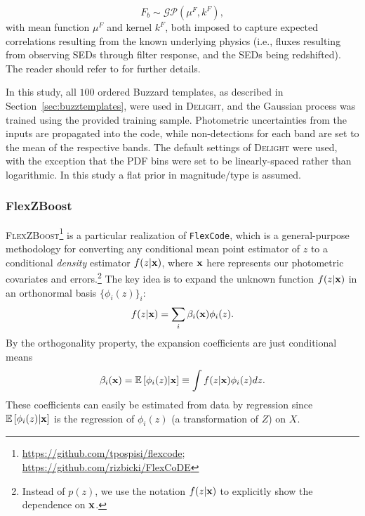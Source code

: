 \begin{equation} \label{eq:delight_gp}
F_b \sim \mathcal{GP}\left( \mu^F,k^F \right),
\end{equation}
\noindent with mean function $\mu^F$ and kernel $k^F$, both imposed to capture expected correlations resulting from the known underlying physics (i.e., fluxes resulting from observing SEDs through filter response, and the SEDs being redshifted).
The reader should refer to \citet{Leistedt:17} for further details.

In this study, all $100$ ordered Buzzard templates, as described in Section~\ref{sec:buzztemplates}, were used in \textsc{Delight}, and the Gaussian process was trained using the provided training sample.
Photometric uncertainties from the inputs are propagated into the code, while non-detections for each band are set to the mean of the respective bands.
The default settings of \textsc{Delight} were used, with the exception that the PDF bins were set to be linearly-spaced rather than logarithmic. In this study a flat prior in magnitude/type is assumed.

\subsubsection{FlexZBoost}
\label{sec:flexzboost}

\textsc{FlexZBoost}\footnote{\url{https://github.com/tpospisi/flexcode};\\ \url{https://github.com/rizbicki/FlexCoDE}} \citep{Izbicki:17} is a particular realization of \texttt{FlexCode}, which is a general-purpose methodology for converting any conditional mean point estimator of $z$ to a conditional {\em density} estimator $f(z \vert {\mathbf{x}})$, where ${\mathbf{x}}$ here represents our photometric covariates and errors.\footnote{Instead of $p(z)$, we use the notation $f(z \vert {\mathbf{x}})$ to explicitly show the dependence on ${\mathbf{x}}$.}
The key idea is to expand the unknown function $f(z \vert {\mathbf{x}})$ in an orthonormal basis $\{\phi_i(z)\}_{i}$:
\begin{equation}
f(z|{\mathbf{x}})=\sum_{i}\beta_{i }({\mathbf{x}})\phi_i(z). \label{eq::series_expansion}
\end{equation}
By the orthogonality property, the expansion coefficients are just conditional means
\begin{equation}
\beta_{i }({\mathbf{x}}) =  \mathbb{E}\left[\phi_i(z)|{\mathbf{x}}\right] \equiv \int f(z|{\mathbf{x}})   \phi_i(z) dz. \label{eq:FlexZBoost_coeffs}
\end{equation}
These coefficients can easily be estimated from data by regression since $\mathbb{E}\left[\phi_i(z)|{\mathbf{x}}\right]$ is the regression of $\phi_i(z)$ (a transformation of $Z$) on $X$.


